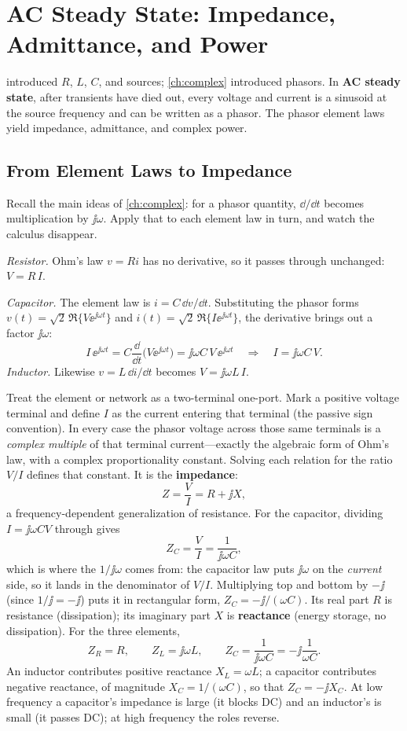\chapter{AC Steady State: Impedance, Admittance, and Power}
\label{ch:ac}
 introduced \(R\), \(L\), \(C\), and sources;
\cref{ch:complex} introduced phasors. In \textbf{AC steady state}, after transients
have died out, every voltage and current is a sinusoid at the source frequency and
can be written as a phasor. The phasor element laws yield impedance, admittance,
and complex power.

\section{From Element Laws to Impedance}
Recall the main ideas of \cref{ch:complex}: for a phasor quantity, \(\dd/\dd t\)
becomes multiplication by \(\jj\omega\). Apply that to each element law in turn,
and watch the calculus disappear.

\emph{Resistor.} Ohm's law \(v=Ri\) has no derivative, so it passes through
unchanged: \(V=R\,I\).

\emph{Capacitor.} The element law is \(i=C\,\dd v/\dd t\). Substituting the phasor
forms \(v(t)=\sqrt2\,\Re\{V\ee^{\jj\omega t}\}\) and
\(i(t)=\sqrt2\,\Re\{I\ee^{\jj\omega t}\}\), the derivative brings out a factor
\(\jj\omega\):
\[
I\,\ee^{\jj\omega t}=C\frac{\dd}{\dd t}\bigl(V\ee^{\jj\omega t}\bigr)
=\jj\omega C\,V\,\ee^{\jj\omega t}
\quad\Longrightarrow\quad
I=\jj\omega C\,V .
\]
\emph{Inductor.} Likewise \(v=L\,\dd i/\dd t\) becomes \(V=\jj\omega L\,I\).

Treat the element or network as a two-terminal one-port. Mark a positive voltage
terminal and define \(I\) as the current entering that terminal (the passive sign
convention). In every case the phasor voltage across those same terminals is a
\emph{complex multiple} of that terminal current---exactly the algebraic form of
Ohm's law, with a complex proportionality constant. Solving each relation for the
ratio \(V/I\) defines that constant. It is the \textbf{impedance}:
\[
Z=\frac{V}{I}=R+\jj X,
\]
a frequency-dependent generalization of resistance. For the capacitor, dividing
\(I=\jj\omega C V\) through gives
\[
Z_C=\frac{V}{I}=\frac{1}{\jj\omega C},
\]
which is where the \(1/\jj\omega\) comes from: the capacitor law puts \(\jj\omega\)
on the \emph{current} side, so it lands in the denominator of \(V/I\). Multiplying
top and bottom by \(-\jj\) (since \(1/\jj=-\jj\)) puts it in rectangular form,
\(Z_C=-\jj/(\omega C)\). Its real part \(R\) is
resistance (dissipation); its imaginary part \(X\) is \textbf{reactance} (energy
storage, no dissipation). For the three elements,
\[
Z_R=R,\qquad
Z_L=\jj\omega L,\qquad
Z_C=\frac{1}{\jj\omega C}=-\jj\frac{1}{\omega C}.
\]
An inductor contributes positive reactance \(X_L=\omega L\); a capacitor
contributes negative reactance, of magnitude \(X_C=1/(\omega C)\), so that
\(Z_C=-\jj X_C\). At low frequency a capacitor's impedance is large
(it blocks DC) and an inductor's is small (it passes DC); at high frequency the
roles reverse.
\cite[pp.~22--29]{white2004highfrequency}


